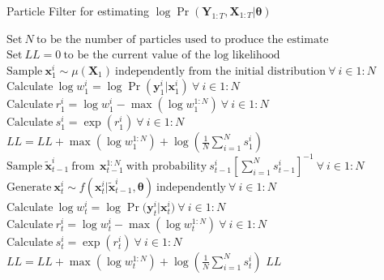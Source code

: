 \documentclass[a4paper,12pt]{article}
\begin{document}
\begin{algorithm}[H]
\caption{\label{pfAlg2} Particle Filter for estimating $\log\Pr(\boldsymbol{Y}_{1:T}, \boldsymbol{X}_{1:T}| \boldsymbol{\theta})$}
\begin{algorithmic}[1]
\begin{spacing}{1.8}
\STATE $\text{Set} \ N \  \text{to be the number of particles used to produce the estimate}$
\STATE $\text{Set} \  LL=0 \ \text{to be the current value of the log likelihood}$
\STATE $\text{Sample} \ \boldsymbol{x}_1^{i} \sim \mu(\boldsymbol{X}_1) \ \text{independently from the initial distribution} \  \forall \ i \in 1:N $
\STATE $\text{Calculate} \ \log{w^i_1} = \log{\Pr(\boldsymbol{y}^i_1 | \boldsymbol{x}_1^i)}\  \forall \ i \in 1:N$
\STATE $\text{Calculate} \ r^i_1 = \log{w_1^i} - \max{(\log{w_1^{1:N}})} \  \forall \ i \in 1:N $
\STATE $\text{Calculate} \ s_1^i = \exp{(r_1^i)} \  \forall \ i \in 1:N $
\STATE $LL = LL + \max{(\log{w_1^{1:N}})} + \log{(\frac{1}{N}\sum_{i=1}^N s_1^i)}$
       \STATE $\text{Sample} \ \boldsymbol{\tilde{x}}_{t-1}^{i} \ \text{from}\ \ \boldsymbol{x}_{t-1}^{1:N} \ \text{with probability} \  s_{t-1}^{i}{\left[\sum_{i=1}^N{s_{t-1}^i}\right]}^{-1} \  \forall \ i \in 1:N$
       \STATE $\text{Generate} \ \boldsymbol{x}_t^{i} \sim f(\boldsymbol{x}_t^{i} | \boldsymbol{\tilde{x}}_{t-1}^{i}, \boldsymbol{\theta}) \ \text{independently} \  \forall \ i \in 1:N $
       \STATE $\text{Calculate} \ \log{w^i_t} = \log{\Pr(\boldsymbol{y}^i_t} | \boldsymbol{x}_t^i)\  \forall \ i \in 1:N$
       \STATE $\text{Calculate} \ r^i_t = \log{w_t^i} - \max{(\log{w_t^{1:N}})} \  \forall \ i \in 1:N $
       \STATE $\text{Calculate} \ s_t^i = \exp{(r_t^i)} \  \forall \ i \in 1:N $
       \STATE $LL = LL + \max{(\log{w_t^{1:N}})} + \log{(\frac{1}{N}\sum_{i=1}^N s_t^i)}$
\ENDFOR
\RETURN $LL$
\end{spacing}
\end{algorithmic}
\end{algorithm}
\end{document}
